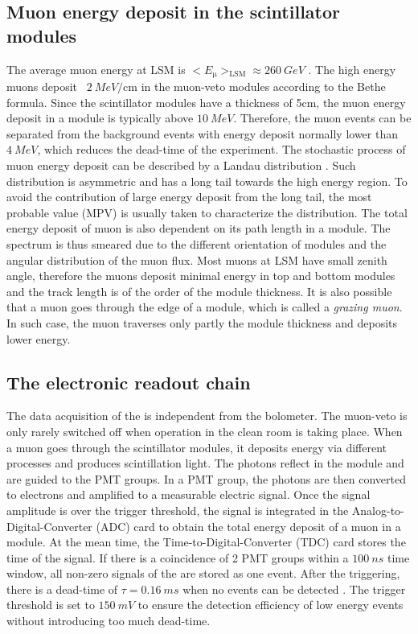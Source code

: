 \subsection{Muon energy deposit in the scintillator modules}
The average muon energy at LSM is $<E_{\upmu}>_{\mathrm{LSM}}\approx \SI{260}{GeV}$ \cite{Klu13}. The high energy muons deposit ~$\SI{2}{MeV\per\cm}$ in the muon-veto modules according to the Bethe formula. Since the scintillator modules have a thickness of 5cm, the muon energy deposit in a module is typically above $\SI{10}{MeV}$. Therefore, the muon events can be separated from the background events with energy deposit normally lower than $\SI{4}{MeV}$, which reduces the dead-time of the experiment.
The stochastic process of muon energy deposit can be described by a Landau distribution \cite{Lan44}. Such distribution is asymmetric and has a long tail towards the high energy region. To avoid the contribution of large energy deposit from the long tail, the most probable value (MPV) is usually taken to characterize the distribution.
The total energy deposit of muon is also dependent on its path length in a module. The spectrum is thus smeared due to the different orientation of modules and the angular distribution of the muon flux. Most muons at LSM have small zenith angle, therefore the muons deposit minimal energy in top and bottom modules and the track length is of the order of the module thickness.
It is also possible that a muon goes through the edge of a module, which is called a \textit{grazing muon}. In such case, the muon traverses only partly the module thickness and deposits lower energy.

\subsection{The electronic readout chain}
The data acquisition of the \mvs is independent from the bolometer. The muon-veto is only rarely switched off when operation in the clean room is taking place.
When a muon goes through the scintillator modules, it deposits energy via different processes and produces scintillation light. The photons reflect in the module and are guided to the PMT groups. In a PMT group, the photons are then converted to electrons and amplified to a measurable electric signal. Once the signal amplitude is over the trigger threshold, the signal is integrated in the Analog-to-Digital-Converter (ADC) card to obtain the total energy deposit of a muon in a module. At the mean time, the Time-to-Digital-Converter (TDC) card stores the time of the signal. If there is a coincidence of 2 PMT groups within a $\SI{100}{ns}$ time window, all non-zero signals of the \mvs are stored as one event. After the triggering, there is a dead-time of $\tau=\SI{0.16}{ms}$ when no events can be detected \cite{Sch13b}. The trigger threshold is set to $\SI{150}{mV}$ to ensure the detection efficiency of low energy events without introducing too much dead-time.

